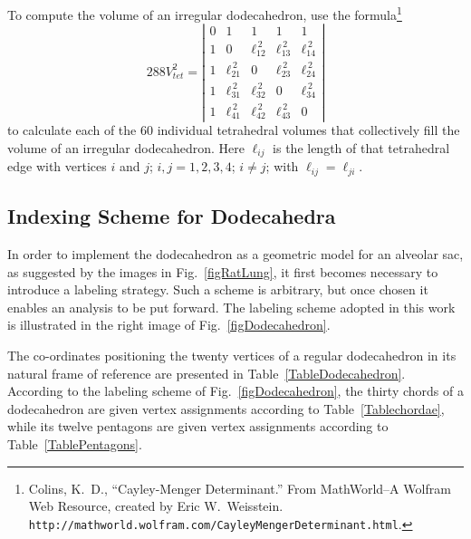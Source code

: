 To compute the volume of an irregular dodecahedron, use the formula\footnote{
	Colins, K.~D., ``Cayley-Menger Determinant.'' From MathWorld--A Wolfram Web Resource, created by Eric W.\ Weisstein. \texttt{http://mathworld.wolfram.com/Cayley\-MengerDeterminant.html}.
}
\begin{equation}
	288 V^2_{tet} = \left| \begin{matrix}
	0 & 1 & 1 & 1 & 1 \\
	1 & 0 & \ell_{12}^{\,2} & \ell_{13}^{\,2} & \ell_{14}^{\,2} \\
	1 & \ell_{21}^{\,2} & 0 & \ell_{23}^{\,2} & \ell_{24}^{\,2} \\
	1 & \ell_{31}^{\,2} & \ell_{32}^{\,2} & 0 & \ell_{34}^{\,2} \\
	1 & \ell_{41}^{\,2} & \ell_{42}^{\,2} & \ell_{43}^{\,2} & 0
	\end{matrix} \right|
	\label{tetrahedralVolume}
\end{equation}
to calculate each of the 60 individual tetrahedral volumes that collectively fill the volume of an irregular dodecahedron.  Here $\ell_{ij}$ is the length of that tetrahedral edge with vertices $i$ and $j$; $i, j = 1, 2, 3, 4$; $i \neq j$; with $\ell_{ij} = \ell_{ji}$.

\subsection{Indexing Scheme for Dodecahedra}

In order to implement the dodecahedron as a geometric model for an alveolar sac, as suggested by the images in Fig.~\ref{figRatLung}, it first becomes necessary to introduce a labeling strategy. Such a scheme is arbitrary, but once chosen it enables an analysis to be put forward.  The labeling scheme adopted in this work is illustrated in the right image of Fig.~\ref{figDodecahedron}. 
  
The co-ordinates positioning the twenty vertices of a regular dodecahedron in its natural frame of reference are presented in Table~\ref{TableDodecahedron}.  According to the labeling scheme of Fig.~\ref{figDodecahedron}, the thirty chords of a dodecahedron are given vertex assignments according to Table~\ref{Tablechordae}, while its twelve pentagons are given vertex assignments according to Table~\ref{TablePentagons}.

